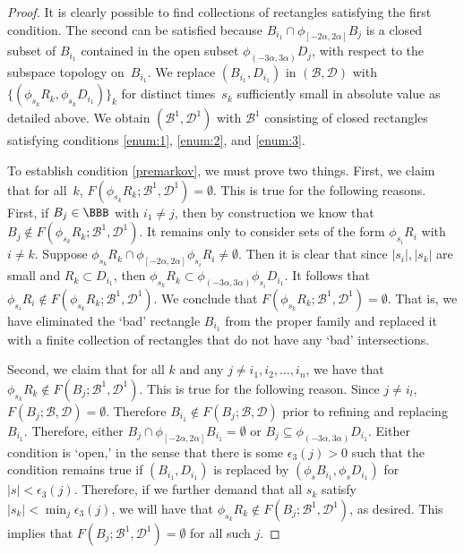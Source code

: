\begin{proof}
It is clearly possible to find collections of rectangles satisfying the first condition. The second can be satisfied because $B_{i_1} \cap \phi_{[-2\alpha, 2\alpha]}B_j$ is a closed subset of $B_{i_1}$ contained in the open subset $\phi_{(-3\alpha,3\alpha)} D_j$, with respect to the subspace topology on~$B_{i_1}$.
We replace $(B_{i_1}, D_{i_1})$ in $(\mathcal{B}, \mathcal{D})$ with $\{(\phi_{s_{k}}R_{k}, \phi_{s_{k}} D_{i_1})\}_k$ for distinct times~$s_{k}$ sufficiently small in absolute value as detailed above. We obtain $(\mathcal{B}^1, \mathcal{D}^1)$ with $\mathcal{B}^1$ consisting of closed rectangles satisfying conditions \eqref{enum:1}, \eqref{enum:2}, and \eqref{enum:3}.

To establish condition \eqref{premarkov}, we must prove two things. First, we claim that for all~$k$, $F(\phi_{s_{k}}R_{k}; \mathcal{B}^1, \mathcal{D}^1) = \emptyset$. This is true for the following reasons. First, if $B_j \in \BBB$ with $i_1 \neq j$, then by construction we know that $B_j \notin F(\phi_{s_{k}}R_{k}; \mathcal{B}^1,\mathcal{D}^1)$. It remains only to consider sets of the form $\phi_{s_{i}}R_{i}$ with $i \neq k$. Suppose $\phi_{s_{k}}R_{k} \cap \phi_{[-2\alpha, 2 \alpha]} \phi_{s_{i}}R_{i} \neq \emptyset$. Then it is clear that since $|s_i|, |s_k|$ are small and $R_k \subset D_{i_1}$, then $\phi_{s_{k}}R_{k} \subset \phi_{(-3 \alpha, 3 \alpha)} \phi_{s_i} D_{i_1}$. It follows that $\phi_{s_{i}}R_{i} \notin F(\phi_{s_{k}}R_{k}; \mathcal{B}^1,\mathcal{D}^1)$. We conclude that $F(\phi_{s_{k}}R_{k}; \mathcal{B}^1, \mathcal{D}^1) = \emptyset$.
That is, we have eliminated the `bad' rectangle $B_{i_1}$ from the proper family and replaced it with a finite collection of rectangles that do not have any `bad' intersections.

Second, we claim that for all $k$ and any $j \neq i_1, i_2, \ldots, i_n$, we have that $\phi_{s_k}R_k \notin F(B_j; \mathcal{B}^1,\mathcal{D}^1)$. This is true for the following reason. Since $j \neq i_l$, $F(B_j;\mathcal{B},\mathcal{D}) = \emptyset$. Therefore $B_{i_1}\notin F(B_j; \mathcal{B},\mathcal{D})$ prior to refining and replacing $B_{i_1}$. Therefore, either $B_j \cap \phi_{[-2\alpha,2\alpha]}B_{i_1} = \emptyset$ or $B_j\subseteq \phi_{(-3\alpha,3\alpha)}D_{i_1}$. Either condition is `open,' in the sense that there is some $\epsilon_3(j)>0$ such that the condition remains true if $(B_{i_1},D_{i_1})$ is replaced by $(\phi_s B_{i_1}, \phi_s D_{i_1})$ for $|s|<\epsilon_3(j)$. Therefore, if we further demand that all $s_k$ satisfy $|s_k|<\min_j \epsilon_3(j)$, we will have that $\phi_{s_k}R_k \notin F(B_j; \mathcal{B}^1,\mathcal{D}^1)$, as desired. This implies that $F(B_j;\mathcal{B}^1,\mathcal{D}^1)=\emptyset$ for all such $j$.


\end{proof}
